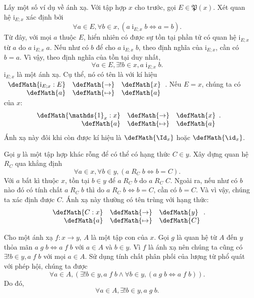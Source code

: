 Lấy một số ví dụ về ánh xạ. Với tập hợp $x$ cho trước, gọi $E \in \mathfrak{P}(x)$. Xét quan hệ $\mathrm{i}_{E;x}$ xác định bởi \begin{equation*}
   \forall a \in E, \forall b \in x, (a\;\mathrm{i}_{E;x}\;b \iff a = b).
\end{equation*}
Từ đây, với mọi $a$ thuộc $E$, hiển nhiên có được sự tồn tại phần tử có quan hệ $\mathrm{i}_{E;x}$ từ $a$ do $a\;\mathrm{i}_{E;x}\;a$. Nếu như có $b$ để cho $a\;\mathrm{i}_{E;x}\;b$, theo định nghĩa của $\mathrm{i}_{E;x}$, cần có $b = a$. Vì vậy, theo định nghĩa của tồn tại duy nhất, \begin{equation*}
   \forall a \in E, \exists !b \in x, a\;\mathrm{i}_{E;x}\;b.
\end{equation*}
$\mathrm{i}_{E;x}$ là một ánh xạ. Cụ thể, nó có tên là  với kí hiệu $\begin{array}[t]{rcl}
\defMath{\mathrm{i}_{E;x}: E} & \defMath{\to} & \defMath{x} \\
   \defMath{a} & \defMath{\mapsto} & \defMath{a}
\end{array}$. Nếu $E = x$, chúng ta có  của $x$: $$\begin{array}[t]{rcl}
\defMath{\mathds{1}_{x}: x} & \defMath{\to} & \defMath{x} \\
   \defMath{a} & \defMath{\mapsto} & \defMath{a}
\end{array}.$$ Ánh xạ này đôi khi còn được kí hiệu là $\defMath{\Id_x}$ hoặc $\defMath{\id_x}$.

Gọi $y$ là một tập hợp khác rỗng để có thể có hạng thức $C \in y$. Xây dựng quan hệ $R_C$ qua khẳng định \begin{equation*}
   \forall a \in x, \forall b \in y, (a\;R_C\;b \iff b = C).
\end{equation*}
Với $a$ bất kì thuộc $x$, tồn tại $b \in y$ để $a\;R_C\;b$ do $a\;R_C\;C$. Ngoài ra, nếu như có $b$ nào đó có tính chất $a\;R_C\;b$ thì do $a\;R_C\;b \iff b = C$, cần có $b = C$. Và vì vậy, chúng ta xác định được  $C$. Ánh xạ này thường có tên trùng với hạng thức:
$$\begin{array}[t]{rcl}
   \defMath{C: x} & \defMath{\to} & \defMath{y} \\
   \defMath{a} & \defMath{\mapsto} & \defMath{C}
\end{array}.$$

Cho một ánh xạ $f: x \to y$, $A$ là một tập con của $x$. Gọi $g$ là quan hệ từ $A$ đến $y$ thỏa mãn $a\;g\;b \iff a\;f\;b$ với $a \in A$ và $b \in y$. Vì $f$ là ánh xạ nên chúng ta cũng có $\exists ! b \in y, a\;f\;b$ với mọi $a \in A$. Sử dụng tính chất phân phối của lượng từ phổ quát với phép hội, chúng ta được 
\begin{equation*}
   \forall a \in A, (\exists ! b \in y, a\;f\;b \land \forall b \in y, (a\;g\;b \iff a\;f\;b)).
\end{equation*}
Do đó, 
\begin{equation*}
   \forall a \in A, \exists ! b \in y, a\;g\;b.
\end{equation*}

